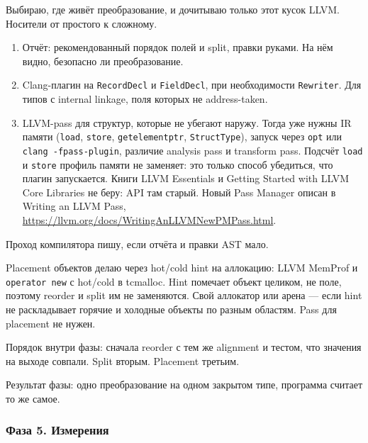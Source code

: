 \documentclass[a4paper,12pt]{article}
\begin{document}
Выбираю, где живёт преобразование, и дочитываю только этот кусок
LLVM. Носители от простого к сложному.

\begin{ai}
\begin{enumerate}
    \item Отчёт: рекомендованный порядок полей и split, правки
    руками. На нём видно, безопасно ли преобразование.
    \item Clang-плагин на \texttt{RecordDecl} и \texttt{FieldDecl},
    при необходимости \texttt{Rewriter}. Для типов с internal
    linkage, поля которых не address-taken.
    \item LLVM-pass для структур, которые не убегают наружу. Тогда
    уже нужны IR памяти (\texttt{load}, \texttt{store},
    \texttt{getelementptr}, \texttt{StructType}), запуск через
    \texttt{opt} или \texttt{clang -fpass-plugin}, различие analysis
    pass и transform pass. Подсчёт \texttt{load} и \texttt{store}
    профиль памяти не заменяет: это только способ убедиться, что
    плагин запускается. Книги LLVM Essentials и Getting Started with
    LLVM Core Libraries не беру: API там старый. Новый Pass Manager
    описан в Writing an LLVM Pass,
    \url{https://llvm.org/docs/WritingAnLLVMNewPMPass.html}.
\end{enumerate}

Проход компилятора пишу, если отчёта и правки AST мало.

Placement объектов делаю через hot/cold hint на аллокацию: LLVM
MemProf и \texttt{operator new} с hot/cold в tcmalloc. Hint помечает
объект целиком, не поле, поэтому reorder и split им не заменяются.
Свой аллокатор или арена --- если hint не раскладывает горячие и
холодные объекты по разным областям. Pass для placement не нужен.

Порядок внутри фазы: сначала reorder с тем же alignment и тестом,
что значения на выходе совпали. Split вторым. Placement третьим.
\end{ai}

Результат фазы: одно преобразование на одном закрытом типе,
программа считает то же самое.

\subsubsection{Фаза 5. Измерения}
\end{document}

